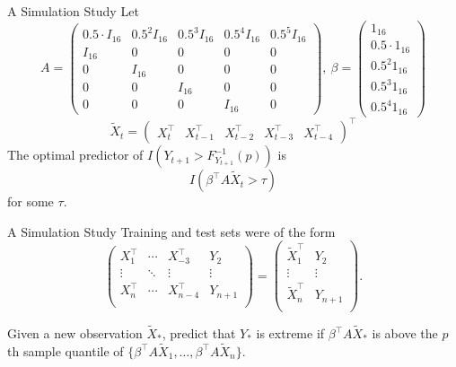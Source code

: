 \documentclass{beamer}
\begin{document}
\begin{frame}{A Simulation Study}
    Let 
    \[
    A =
    \left(
    \begin{matrix}
        0.5 \cdot I_{16} & 0.5^2 I_{16} & 0.5^3 I_{16} & 0.5^4 I_{16} & 0.5^5 I_{16} \\
        I_{16} & 0 & 0 & 0 & 0 \\
        0 & I_{16} & 0 & 0 & 0 \\
        0 & 0 & I_{16} & 0 & 0 \\
        0 & 0 & 0 & I_{16} & 0
    \end{matrix}
    \right), \
    \beta =
    \left(
    \begin{matrix}
        1_{16} \\
        0.5 \cdot 1_{16} \\
        0.5^2 1_{16} \\
        0.5^3 1_{16} \\
        0.5^4 1_{16}
    \end{matrix}
    \right)
    \]
    \[
    \tilde{X}_t = 
    \left(
    \begin{matrix}
        X_t^{\top} & X_{t - 1}^{\top} & X_{t - 2}^{\top} & X_{t - 3}^{\top} & X_{t - 4}^{\top}
    \end{matrix}
    \right)^{\top}
    \]
    The optimal predictor of $I(Y_{t + 1} > F_{Y_{t + 1}}^{-1}(p))$ is
    \[
    I(\beta^{\top} A\tilde{X}_t > \tau)
    \]
    for some $\tau$.
\end{frame}

\begin{frame}{A Simulation Study}
    Training and test sets were of the form
    \[
    \left(
    \begin{matrix}
    X_1^{\top} & \cdots & X_{-3}^{\top} & Y_2 \\
    \vdots & \ddots & \vdots & \vdots \\
    X_n^{\top} & \cdots & X_{n - 4}^{\top} & Y_{n + 1} \\
    \end{matrix}
    \right)
    =
    \left(
    \begin{matrix}
    \tilde{X}_1^{\top} & Y_2 \\
    \vdots & \vdots \\
    \tilde{X}_n^{\top} & Y_{n + 1} \\
    \end{matrix}
    \right).
    \]

    Given a new observation $\tilde{X}_*$, predict that $Y_*$ is extreme if $\beta^{\top} A\tilde{X}_*$ is above the $p$th sample quantile of $\{\beta^{\top} A\tilde{X}_1, \ldots, \beta^{\top} A\tilde{X}_n\}$.
\end{frame}
\end{document}
